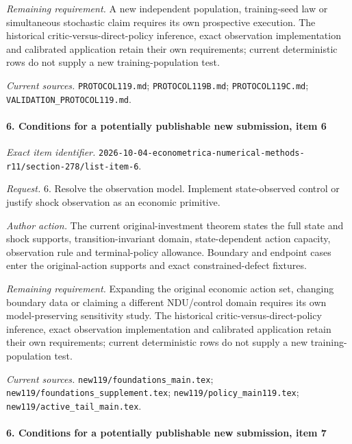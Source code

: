 \par\emph{Remaining requirement.} A new independent population, training-seed law or simultaneous stochastic claim requires its own prospective execution. The historical critic-versus-direct-policy inference, exact observation implementation and calibrated application retain their own requirements; current deterministic rows do not supply a new training-population test.

\par\emph{Current sources.} \nolinkurl{PROTOCOL119.md}; \nolinkurl{PROTOCOL119B.md}; \nolinkurl{PROTOCOL119C.md}; \nolinkurl{VALIDATION_PROTOCOL119.md}.

\paragraph{6. Conditions for a potentially publishable new submission, item 6}

\emph{Exact item identifier.} \nolinkurl{2026-10-04-econometrica-numerical-methods-r11/section-278/list-item-6}.

\par\emph{Request.} 6. Resolve the observation model. Implement state-observed control or justify shock observation as an economic primitive.

\par\emph{Author action.} The current original-investment theorem states the full state and shock supports, transition-invariant domain, state-dependent action capacity, observation rule and terminal-policy allowance. Boundary and endpoint cases enter the original-action supports and exact constrained-defect fixtures.

\par\emph{Remaining requirement.} Expanding the original economic action set, changing boundary data or claiming a different NDU/\allowbreak{}control domain requires its own model-preserving sensitivity study. The historical critic-versus-direct-policy inference, exact observation implementation and calibrated application retain their own requirements; current deterministic rows do not supply a new training-population test.

\par\emph{Current sources.} \nolinkurl{new119/foundations_main.tex}; \nolinkurl{new119/foundations_supplement.tex}; \nolinkurl{new119/policy_main119.tex}; \nolinkurl{new119/active_tail_main.tex}.

\paragraph{6. Conditions for a potentially publishable new submission, item 7}

